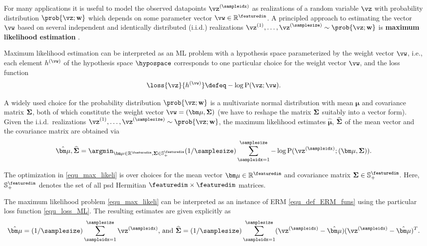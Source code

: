 \documentclass[12pt]{report}
\newcommand{\featurelen}{\featuredim}
\begin{document}
For many applications it is useful to model the observed datapoints $\vz^{(\sampleidx)}$ 
as realizations of a random variable $\vz$ with probability distribution $\prob{\vz; \mathbf{w}}$ 
which depends on some parameter vector $\vw \in \mathbb{R}^{\featuredim}$. A principled 
approach to estimating the vector $\vw$ based on several independent and identically 
distributed (i.i.d.) realizations $\vz^{(1)},\ldots,\vz^{(\samplesize)}\sim \prob{\vz; \mathbf{w}}$ is 
{\bf maximum likelihood estimation} \cite{LC}. 

Maximum likelihood estimation can be interpreted as an ML problem with a hypothesis space 
parameterized by the weight vector $\vw$, i.e., each element $h^{(\vw)}$ of the hypothesis 
space $\hypospace$ corresponds to one particular choice for the 
weight vector $\vw$, and the loss function 
\begin{equation} 
\label{equ_loss_ML}
\loss{\vz}{h^{(\vw)}} \defeq - \log {\rm P} (\vz; \vw). 
\end{equation} 

A widely used choice for the probability distribution $\prob{\vz; \mathbf{w}}$ is a multivariate normal 
distribution with mean ${\bm \mu}$ and covariance matrix ${\bf \Sigma}$, both of which constitute the 
weight vector $\vw = ({\bm \mu}, {\bf \Sigma})$ (we have to reshape the matrix ${\bf \Sigma}$ suitably 
into a vector form). Given the i.i.d.\ realizations $\vz^{(1)},\ldots,\vz^{(\samplesize)} \sim \prob{\vz; \mathbf{w}}$,  
the maximum likelihood estimates $\hat{\bm \mu}$, $\widehat{\bf \Sigma}$ of the mean vector and 
the covariance matrix are obtained via 
\begin{equation}
\label{equ_max_likeli}
\hat{\bm \mu}, \widehat{\bf \Sigma} = \argmin_{{\bm \mu} \in \mathbb{R}^{\featurelen},{\bf \Sigma} \in \mathbb{S}^{\featurelen}_{+}} (1/\samplesize) \sum_{\sampleidx=1}^{\samplesize} - \log {\rm P} (\vz^{(\sampleidx)}; ({\bm \mu},{\bf \Sigma})). 
\end{equation} 

The optimization in \eqref{equ_max_likeli} is over choices for the mean 
vector ${\bm \mu} \in \mathbb{R}^{\featurelen}$ and covariance matrix 
${\bf \Sigma} \in \mathbb{S}^{\featurelen}_{+}$. Here, $\mathbb{S}^{\featurelen}_{+}$ 
denotes the set of all psd Hermitian $\featurelen \times \featurelen$ matrices. 

The maximum likelihood problem \eqref{equ_max_likeli} can be 
interpreted as an instance of ERM \eqref{equ_def_ERM_funs} using the 
particular loss function \eqref{equ_loss_ML}. The resulting estimates are 
given explicitly as 
\begin{equation}
\label{equ_ML_mean_cov_Gauss} 
\hat{\bm \mu} = (1/\samplesize) \sum_{\sampleidx=1}^{\samplesize} \vz^{(\sampleidx)} \mbox{, and } \widehat{\bf \Sigma} = (1/\samplesize) \sum_{\sampleidx=1}^{\samplesize} (\vz^{(\sampleidx)} - \hat{\bm \mu})(\vz^{(\sampleidx)} - \hat{\bm \mu})^{T}.
\end{equation} 
\end{document}

